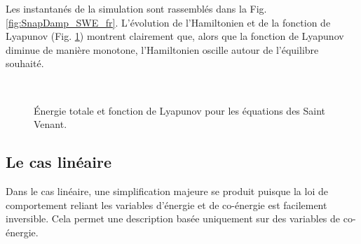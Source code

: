 Les instantanés de la simulation sont rassemblés dans la Fig. \ref{fig:SnapDamp_SWE_fr}. L'évolution de l'Hamiltonien et de la fonction de Lyapunov  (Fig. \ref{fig:HL_SWE_fr}) montrent clairement que, alors que la fonction de Lyapunov diminue de manière monotone, l'Hamiltonien oscille autour de l'équilibre souhaité.

\begin{figure}[htb]%
	\centering
	\hspace{8pt}%
	 \\
	\caption{Énergie totale et fonction de Lyapunov pour les équations des Saint Venant.}%
	\label{fig:HL_SWE_fr}%
\end{figure}


\begin{figure*}[p]
	\centering
	\hfil
	\hfil
	\hfil
	\hfil
	\caption{Instantanés à différents moments de la simulation pour les équations irrotationnelles de Saint Venant contrôlées à la frontière.}
	\label{fig:SnapDamp_SWE_fr}
	\hfil
\end{figure*}


\subsection*{Le cas linéaire}
Dans le cas linéaire, une simplification majeure se produit puisque la loi de comportement reliant les variables d'énergie et de co-énergie est facilement inversible. Cela permet une description basée uniquement sur des variables de co-énergie. \\

